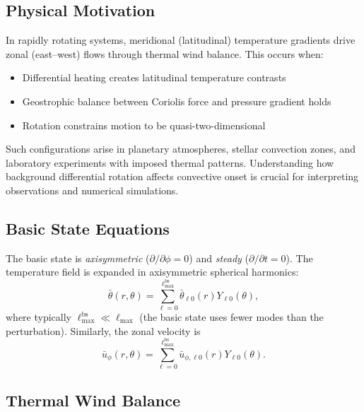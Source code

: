\documentclass[11pt]{article}
\numberwithin{equation}{section}
\begin{document}
\subsection{Physical Motivation}

In rapidly rotating systems, meridional (latitudinal) temperature gradients drive zonal (east--west) flows through thermal wind balance. This occurs when:
\begin{itemize}
  \item Differential heating creates latitudinal temperature contrasts
  \item Geostrophic balance between Coriolis force and pressure gradient holds
  \item Rotation constrains motion to be quasi-two-dimensional
\end{itemize}

Such configurations arise in planetary atmospheres, stellar convection zones, and laboratory experiments with imposed thermal patterns. Understanding how background differential rotation affects convective onset is crucial for interpreting observations and numerical simulations.

\subsection{Basic State Equations}

The basic state is \emph{axisymmetric} ($\partial/\partial\phi = 0$) and \emph{steady} ($\partial/\partial t = 0$). The temperature field is expanded in axisymmetric spherical harmonics:
\begin{equation}
  \bar{\theta}(r,\theta) = \sum_{\ell=0}^{\ell_{\max}^{\text{bs}}} \bar{\theta}_{\ell 0}(r) Y_{\ell 0}(\theta),
  \label{eq:basic_theta}
\end{equation}
where typically $\ell_{\max}^{\text{bs}} \ll \ell_{\max}$ (the basic state uses fewer modes than the perturbation). Similarly, the zonal velocity is
\begin{equation}
  \bar{u}_\phi(r,\theta) = \sum_{\ell=0}^{\ell_{\max}^{\text{bs}}} \bar{u}_{\phi,\ell 0}(r) Y_{\ell 0}(\theta).
  \label{eq:basic_uphi}
\end{equation}

\subsection{Thermal Wind Balance}
\end{document}
